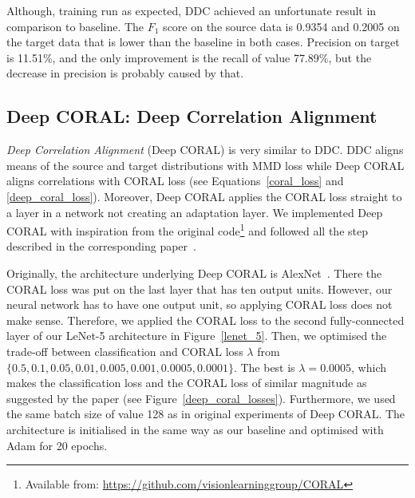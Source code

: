 Although, training run as expected,
DDC achieved an unfortunate result in comparison to baseline.
The \(F_1\) score on the source data is 0.9354 and 0.2005 on the target data that is lower than the baseline in both cases.
Precision on target is 11.51\%,
and the only improvement is the recall of value 77.89\%,
but the decrease in precision is probably caused by that.

\subsection{Deep CORAL: Deep Correlation Alignment}

\textit{Deep Correlation Alignment} (Deep CORAL) is very similar to DDC.
DDC aligns means of the source and target distributions with MMD loss
while Deep CORAL aligns correlations with CORAL loss
(see Equations~\ref{coral_loss} and \ref{deep_coral_loss}).
Moreover, Deep CORAL applies the CORAL loss straight to a layer in a network
not creating an adaptation layer.
We implemented Deep CORAL with inspiration from the original
code\footnote{Available from: \url{https://github.com/visionlearninggroup/CORAL}}
and followed all the step described in the corresponding paper~\cite{sun2016}.

Originally, the architecture underlying Deep CORAL is AlexNet~\cite{krizhevsky2012}.
There the CORAL loss was put on the last layer that has ten output units.
However, our neural network has to have one output unit,
so applying CORAL loss does not make sense.
Therefore, we applied the CORAL loss to the second fully-connected layer
of our LeNet-5 architecture in Figure~\ref{lenet_5}.
Then, we optimised the trade-off between classification and CORAL loss
\(\lambda\) from \(\{0.5, 0.1, 0.05, 0.01, 0.005, 0.001, 0.0005, 0.0001\}\).
The best is \(\lambda = 0.0005\),
which makes the classification loss and the CORAL loss of similar magnitude as suggested by the paper
(see Figure~\ref{deep_coral_losses}).
Furthermore, we used the same batch size of value 128
as in original experiments of Deep CORAL.
The architecture is initialised in the same way as our baseline
and optimised with Adam for 20 epochs.


